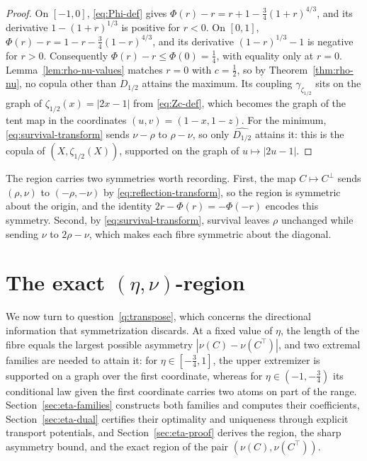 \documentclass[11pt,a4paper]{article}
\theoremstyle{remark}
\newcommand{\1}{\mathbf{1}}
\begin{document}
\begin{proof}
On $[-1,0]$, \eqref{eq:Phi-def} gives $\Phi(r)-r=r+1-\frac34(1+r)^{4/3}$, and its derivative $1-(1+r)^{1/3}$ is positive for $r<0$.
On $[0,1]$, $\Phi(r)-r=1-r-\frac34(1-r)^{4/3}$, and its derivative $(1-r)^{1/3}-1$ is negative for $r>0$.
Consequently $\Phi(r)-r\le\Phi(0)=\frac14$, with equality only at $r=0$.
Lemma~\ref{lem:rho-nu-values} matches $r=0$ with $c=\frac12$, so by Theorem~\ref{thm:rho-nu}, no copula other than $D_{1/2}$ attains the maximum.
Its coupling $\gamma_{\zeta_{1/2}}$ sits on the graph of $\zeta_{1/2}(x)=|2x-1|$ from \eqref{eq:Zc-def}, which becomes the graph of the tent map in the coordinates $(u,v)=(1-x,1-z)$.
For the minimum, \eqref{eq:survival-transform} sends $\nu-\rho$ to $\rho-\nu$, so only $\widehat{D_{1/2}}$ attains it: this is the copula of $(X,\zeta_{1/2}(X))$, supported on the graph of $u\mapsto|2u-1|$.
\end{proof}

The region carries two symmetries worth recording.
First, the map $C\mapsto C^\perp$ sends $(\rho,\nu)$ to $(-\rho,-\nu)$ by \eqref{eq:reflection-transform}, so the region is symmetric about the origin, and the identity $2r-\Phi(r)=-\Phi(-r)$ encodes this symmetry.
Second, by \eqref{eq:survival-transform}, survival leaves $\rho$ unchanged while sending $\nu$ to $2\rho-\nu$, which makes each fibre symmetric about the diagonal.

\section{\texorpdfstring{The exact $(\eta,\nu)$-region}{The exact (eta,nu)-region}}
\label{sec:eta-nu}

We now turn to question~\ref{q:transpose}, which concerns the directional information that symmetrization discards.
At a fixed value of $\eta$, the length of the fibre equals the largest possible asymmetry $|\nu(C)-\nu(C^\top)|$, and two extremal families are needed to attain it: for $\eta\in[-\frac34,1]$, the upper extremizer is supported on a graph over the first coordinate, whereas for $\eta\in(-1,-\frac34)$ its conditional law given the first coordinate carries two atoms on part of the range.
Section~\ref{sec:eta-families} constructs both families and computes their coefficients, Section~\ref{sec:eta-dual} certifies their optimality and uniqueness through explicit transport potentials, and Section~\ref{sec:eta-proof} derives the region, the sharp asymmetry bound, and the exact region of the pair $(\nu(C),\nu(C^\top))$.
\end{document}
